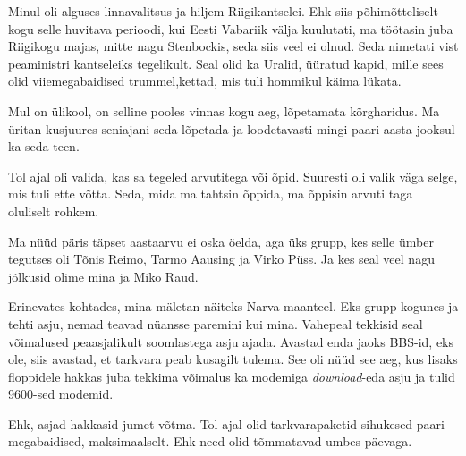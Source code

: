         
Minul oli alguses linnavalitsus ja hiljem 
Riigikantselei. Ehk siis põhimõtteliselt kogu selle 
huvitava perioodi, kui Eesti Vabariik välja kuulutati, ma töötasin juba 
Riigikogu majas, mitte nagu Stenbockis, seda siis veel ei olnud. Seda nimetati 
vist peaministri kantseleiks tegelikult. Seal olid ka 
Uralid, 
üüratud kapid, mille sees olid viiemegabaidised trummel,kettad, mis tuli 
hommikul käima lükata.


Mul on ülikool, on selline pooles vinnas kogu aeg, lõpetamata kõrgharidus. Ma 
üritan kusjuures seniajani seda lõpetada ja loodetavasti mingi paari aasta 
jooksul ka seda teen.

Tol ajal oli valida, kas sa tegeled arvutitega või õpid. Suuresti oli valik 
väga selge, mis tuli ette võtta. Seda, mida ma tahtsin õppida, ma õppisin 
arvuti taga oluliselt rohkem.
                 

Ma nüüd päris täpset aastaarvu ei oska öelda, aga üks grupp, kes selle ümber  
tegutses oli Tõnis Reimo, Tarmo 
Aausing ja Virko Püss. Ja 
kes seal  veel nagu jõlkusid olime mina ja Miko Raud.  


Erinevates kohtades, mina mäletan näiteks Narva maanteel. Eks grupp kogunes ja 
tehti asju, nemad teavad nüansse paremini kui mina. Vahepeal tekkisid seal 
võimalused  peaasjalikult soomlastega asju ajada. Avastad enda jaoks BBS-id, 
eks ole, siis avastad, et tarkvara peab kusagilt tulema. See oli nüüd see aeg, 
kus lisaks floppidele hakkas juba tekkima võimalus ka modemiga 
\emph{download}-eda asju ja  tulid 9600-sed modemid.

Ehk, asjad hakkasid jumet võtma. Tol ajal olid tarkvarapaketid sihukesed paari 
megabaidised, maksimaalselt. Ehk need olid tõmmatavad umbes päevaga.

                 
